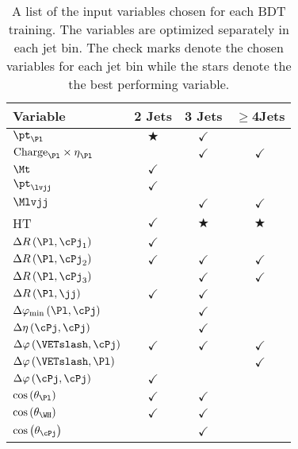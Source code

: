 \begin{table}[htbp]
\centering
\begin{tabular}{lccc} \hline
\textbf{Variable} & \textbf{2 Jets} & \textbf{3 Jets} & \textbf{$\geqslant$4Jets} \\\hline
${{}\pt}_{\Pl}$                                   & $\bigstar$   & $\checkmark$ &              \\
${{}\text{Charge}}_{\Pl}\times{{}\eta}_{\Pl}$     &              & $\checkmark$ & $\checkmark$ \\
$\Mt$                                             & $\checkmark$ &              &              \\
${{}\pt}_{\lvjj}$                                 & $\checkmark$ &              &              \\
$\Mlvjj$                                          &              & $\checkmark$ & $\checkmark$ \\
HT                                                & $\checkmark$ & $\bigstar$   & $\bigstar$   \\
$\Delta{R}\left(\Pl,\cPj_{\text{1}}\right)$       & $\checkmark$ &              &              \\
$\Delta{R}\left(\Pl,\cPj_{\text{2}}\right)$       & $\checkmark$ & $\checkmark$ & $\checkmark$ \\
$\Delta{R}\left(\Pl,\cPj_{\text{3}}\right)$       &              & $\checkmark$ & $\checkmark$ \\
$\Delta{R}\left(\Pl,\jj\right)$                   & $\checkmark$ & $\checkmark$ &              \\
$\Delta\varphi_{\text{min}}\left(\Pl,\cPj\right)$ &              & $\checkmark$ &              \\
$\Delta\eta\left(\cPj,\cPj\right)$                &              & $\checkmark$ &              \\
$\Delta\varphi\left(\VETslash,\cPj\right)$        & $\checkmark$ & $\checkmark$ & $\checkmark$ \\
$\Delta\varphi\left(\VETslash,\Pl\right)$         &              &              & $\checkmark$ \\
$\Delta\varphi\left(\cPj,\cPj\right)$             & $\checkmark$ &              &              \\
$\cos\left(\theta_{\Pl}\right)$                   & $\checkmark$ & $\checkmark$ &              \\
$\cos\left(\theta_{\WH}\right)$                   & $\checkmark$ & $\checkmark$ &              \\
$\cos\left(\theta_{\cPj}\right)$                  &              & $\checkmark$ &              \\\hline
\end{tabular}
\caption{A list of the input variables chosen for each BDT training. The variables are optimized separately in each jet bin. The check marks denote the chosen variables for each jet bin while the stars denote the the best performing variable.}
\label{tab:BDT_variables_optimized}
\end{table}

